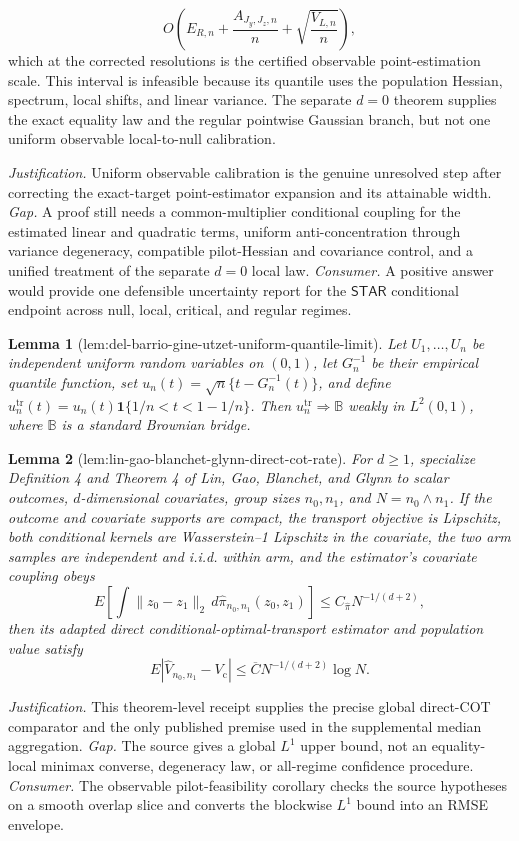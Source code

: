 \documentclass{article}
\newtheorem{lemma}{Lemma}
\begin{document}
\[
O\!\left(E_{R,n}+\frac{A_{J_y,J_z,n}}n+\sqrt{\frac{V_{L,n}}n}\right),
\]
which at the corrected resolutions is the certified observable point-estimation scale. This interval is infeasible because its quantile uses the population Hessian, spectrum, local shifts, and linear variance. The separate \(d=0\) theorem supplies the exact equality law and the regular pointwise Gaussian branch, but not one uniform observable local-to-null calibration.
\par\smallskip\noindent \textit{Justification.} Uniform observable calibration is the genuine unresolved step after correcting the exact-target point-estimator expansion and its attainable width. \textit{Gap.} A proof still needs a common-multiplier conditional coupling for the estimated linear and quadratic terms, uniform anti-concentration through variance degeneracy, compatible pilot-Hessian and covariance control, and a unified treatment of the separate \(d=0\) local law. \textit{Consumer.} A positive answer would provide one defensible uncertainty report for the \(\mathsf{STAR}\) conditional endpoint across null, local, critical, and regular regimes.

\begin{lemma}[lem:del-barrio-gine-utzet-uniform-quantile-limit]\label{lem:del-barrio-gine-utzet-uniform-quantile-limit}
Let \(U_1,\ldots,U_n\) be independent uniform random variables on \((0,1)\), let \(G_n^{-1}\) be their empirical quantile function, set \(u_n(t)=\sqrt n\{t-G_n^{-1}(t)\}\), and define \(u_n^{\mathrm{tr}}(t)=u_n(t)\mathbf 1\{1/n<t<1-1/n\}\).  Then \(u_n^{\mathrm{tr}}\Rightarrow\mathbb B\) weakly in \(L^2(0,1)\), where \(\mathbb B\) is a standard Brownian bridge.
\end{lemma}

\begin{lemma}[lem:lin-gao-blanchet-glynn-direct-cot-rate]\label{lem:lin-gao-blanchet-glynn-direct-cot-rate}
For \(d\ge1\), specialize Definition 4 and Theorem 4 of Lin, Gao, Blanchet, and Glynn to scalar outcomes, \(d\)-dimensional covariates, group sizes \(n_0,n_1\), and \(N=n_0\wedge n_1\).  If the outcome and covariate supports are compact, the transport objective is Lipschitz, both conditional kernels are Wasserstein--1 Lipschitz in the covariate, the two arm samples are independent and i.i.d. within arm, and the estimator's covariate coupling obeys
\[
E\!\left[\int\|z_0-z_1\|_2\,d\widehat\pi_{n_0,n_1}(z_0,z_1)\right]\le C_{\widehat\pi}N^{-1/(d+2)},
\]
then its adapted direct conditional-optimal-transport estimator and population value satisfy
\[
E|\widehat V_{n_0,n_1}-V_{\mathrm c}|\le \overline C N^{-1/(d+2)}\log N.
\]
\end{lemma}
\par\smallskip\noindent \textit{Justification.} This theorem-level receipt supplies the precise global direct-COT comparator and the only published premise used in the supplemental median aggregation. \textit{Gap.} The source gives a global \(L^1\) upper bound, not an equality-local minimax converse, degeneracy law, or all-regime confidence procedure. \textit{Consumer.} The observable pilot-feasibility corollary checks the source hypotheses on a smooth overlap slice and converts the blockwise \(L^1\) bound into an RMSE envelope.
\end{document}
